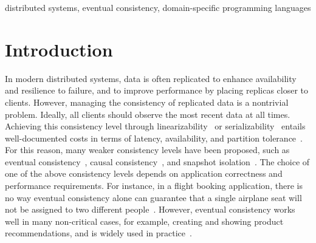 \documentclass[preprint,numbers]{sigplanconf}
\begin{document}


\keywords
distributed systems, eventual consistency, domain-specific programming languages

\section{Introduction}
In modern distributed systems, data is often replicated 
to enhance availability and resilience to failure, and to improve performance by
placing replicas closer to clients.
However, managing the consistency of 
replicated data is a nontrivial problem. Ideally, all clients should observe
the most recent data at all times.
Achieving this consistency level through
linearizability~\cite{herlihy1990linearizability} or
serializability~\cite{papadimitriou1979serializability} entails
well-documented costs in terms of latency, availability, and partition
tolerance~\cite{bailis2013highly, kraska2013mdcc}. For this reason,
many weaker consistency levels have been proposed,
such as eventual consistency~\cite{vogels2009eventually}, causal
consistency~\cite{lamport1978time, schiper1989new}, and snapshot isolation~\cite{kemme2000database}.
The choice of one of the above consistency levels depends on application
correctness and performance requirements. For instance, in a flight booking
application, there is no way eventual consistency alone
can guarantee that a single airplane seat will not be assigned to two different
people~\cite{bailis2014coordination, bailis2013highly}. However, eventual
consistency works well
in many non-critical cases, for example, creating and showing product
recommendations, and is widely used in practice~\cite{eventualeBay,eventualNetflix,hastorun2007dynamo}.
\end{document}
